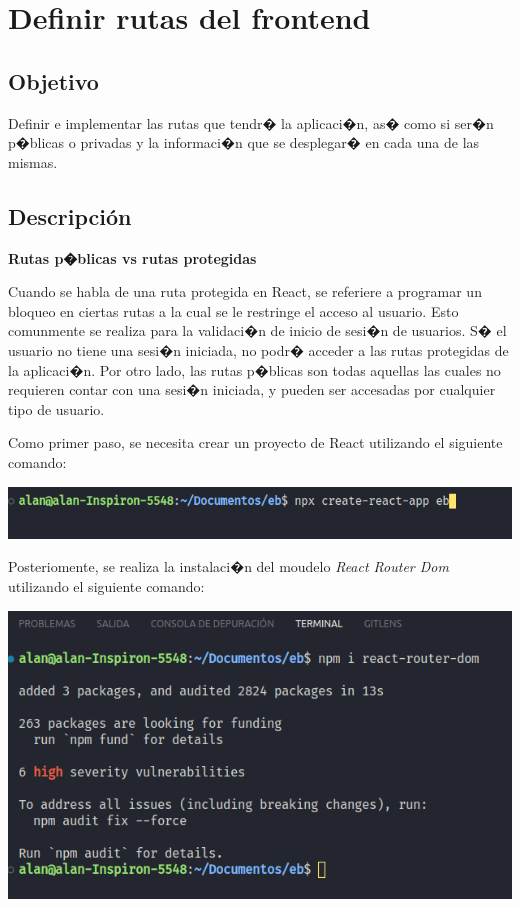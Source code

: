 \documentclass[12pt,letterpaper]{article}
\begin{document}
\newpage
\section{Definir rutas del frontend}

\subsection{Objetivo}
Definir e implementar las rutas que tendr� la aplicaci�n, as� como si ser�n p�blicas o privadas y la informaci�n que se desplegar� en cada una de las mismas.




\subsection{Descripción}

\textbf{Rutas p�blicas vs rutas protegidas}

Cuando se habla de una ruta protegida en React, se referiere a programar un bloqueo en ciertas rutas a la cual se le restringe el acceso al usuario. Esto comunmente se realiza para la validaci�n de inicio de sesi�n de usuarios. S� el usuario no tiene una sesi�n iniciada, no podr� acceder a las rutas protegidas de la aplicaci�n. Por otro lado, las rutas p�blicas son todas aquellas las cuales no requieren contar con una sesi�n iniciada, y pueden ser accesadas por cualquier tipo de usuario\cite{dom}.


Como primer paso, se necesita crear un proyecto de React utilizando el siguiente comando:


\begin{center}
  \includegraphics[scale=0.5]{imagenes/create}
 \label{fig:MongoA} 
\end{center} 


Posteriomente, se realiza la instalaci�n del moudelo \emph{React Router Dom} utilizando el siguiente comando:

\begin{center}
  \includegraphics[scale=0.5]{imagenes/router}
 \label{fig:MongoA} 
\end{center} 
\end{document}
